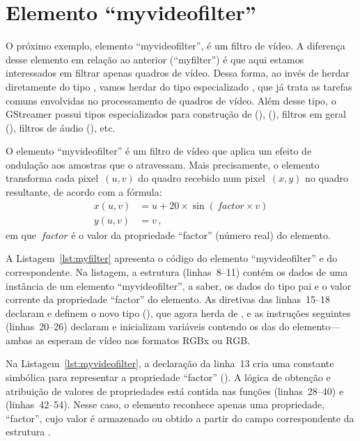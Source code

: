 \documentclass{SBCbookchapter}
\begin{document}

\section*{Elemento ``myvideofilter''}

O próximo exemplo, elemento ``myvideofilter'', é um filtro de vídeo.
A diferença desse elemento em relação ao anterior (``myfilter'') é que aqui
estamos interessados em filtrar apenas quadros de vídeo.  Dessa forma, ao
invés de herdar diretamente do tipo , vamos herdar do tipo
especializado , que já trata as tarefas comuns envolvidas
no processamento de quadros de vídeo.  Além desse tipo, o GStreamer possui
tipos especializados para construção de  (),
 (), filtros em geral (\-),
filtros de áudio (), etc.

O elemento ``myvideofilter'' é um filtro de vídeo que aplica um efeito de
ondulação aos amostras que o atravessam.  Mais precisamente, o elemento
transforma cada pixel~$(u,v)$ do quadro recebido num pixel~$(x,y)$ no quadro
resultante, de acordo com a fórmula:
\begin{align*}
  x(u,v)&=u+20\times\sin(\,\mathit{factor}\times{v})\\
  y(u,v)&=v\,,
\end{align*}
em que~$\mathit{factor}$ é o valor da propriedade ``factor'' (número real)
do elemento.

A Listagem~\ref{lst:myfilter} apresenta o código do elemento
``myvideofilter'' e do  correspondente.  Na listagem, a estrutura
 (linhas~8--11) contém os dados de uma instância de um
elemento ``myvideofilter'', a saber, os dados do tipo pai
\- e o valor corrente da propriedade ``factor'' do
elemento.  As diretivas das linhas~15--18 declaram e definem o novo tipo
(), que agora herda de , e as
instruções seguintes (linhas~20--26) declaram e inicializam variáveis
contendo os  das  do elemento---ambas as 
esperam  de vídeo nos formatos RGBx ou RGB\null.


\clearpage

Na Listagem~\ref{lst:myvideofilter}, a declaração  da linha~13 cria
uma constante simbólica para representar a propriedade ``factor''
().  A lógica de obtenção e atribuição de valores de
propriedades está contida nas funções 
(linhas~28--40) e  (linhas~42--54).
Nesse caso, o elemento reconhece apenas uma propriedade, ``factor'', cujo
valor é armazenado ou obtido a partir do campo correspondente da estrutura
.
\end{document}
